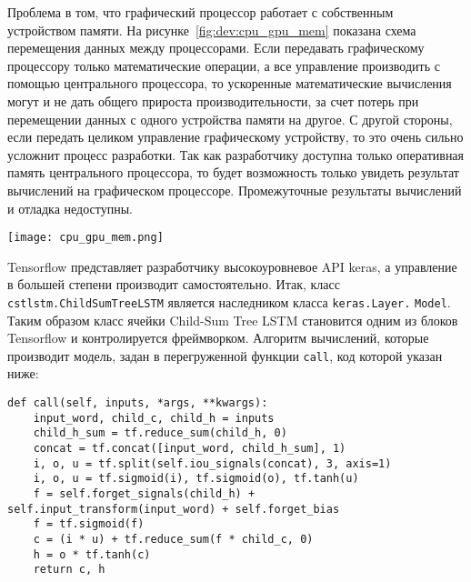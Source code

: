 Проблема в том, что графический процессор работает с собственным устройством памяти. На рисунке~\ref{fig:dev:cpu_gpu_mem} показана схема перемещения данных между процессорами. Если передавать графическому процессору только математические операции, а все управление производить с помощью центрального процессора, то ускоренные математические вычисления могут и не дать общего прироста производительности, за счет потерь при перемещении данных с одного устройства памяти на другое. С другой стороны, если передать целиком управление графическому устройству, то это очень сильно усложнит процесс разработки. Так как разработчику доступна только оперативная память центрального процессора, то будет возможность только увидеть результат вычислений на графическом процессоре. Промежуточные результаты вычислений и отладка недоступны.

\begin{center}
  \texttt{[image: cpu\_gpu\_mem.png]}
  \label{fig:dev:cpu_gpu_mem}
\end{center}

Tensorflow представляет разработчику высокоуровневое API keras, а управление в большей степени производит самостоятельно. Итак, класс \texttt{cst\-lstm.ChildSumTreeLSTM} является наследником класса \texttt{keras.Layer.} \texttt{Model}. Таким образом класс ячейки Child-Sum Tree LSTM становится одним из блоков Tensorflow и контролируется фреймворком. Алгоритм вычислений, которые производит модель, задан в перегруженной функции \texttt{call}, код которой указан ниже:
\medskip
\begin{lstlisting}[style=Python]
  def call(self, inputs, *args, **kwargs):
    input_word, child_c, child_h = inputs
    child_h_sum = tf.reduce_sum(child_h, 0)
    concat = tf.concat([input_word, child_h_sum], 1)
    i, o, u = tf.split(self.iou_signals(concat), 3, axis=1)
    i, o, u = tf.sigmoid(i), tf.sigmoid(o), tf.tanh(u)
    f = self.forget_signals(child_h) + self.input_transform(input_word) + self.forget_bias
    f = tf.sigmoid(f)
    c = (i * u) + tf.reduce_sum(f * child_c, 0)
    h = o * tf.tanh(c)
    return c, h
\end{lstlisting}
\medskip

